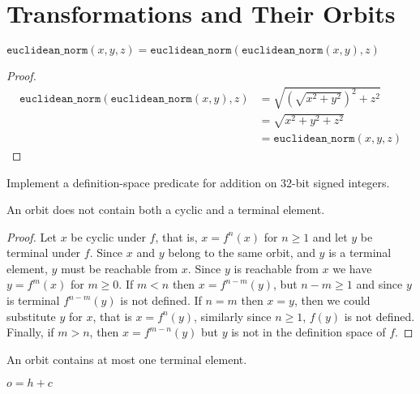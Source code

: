 
\chapter{Transformations and Their Orbits}

\begin{lemma}
	$\mathtt{euclidean\_norm}(x, y, z) = \mathtt{euclidean\_norm}(\mathtt{euclidean\_norm}(x, y), z)$
\end{lemma}

\begin{proof}
	\begin{align*}
		\mathtt{euclidean\_norm}(\mathtt{euclidean\_norm}(x, y), z)
		&= \sqrt{\left (\sqrt{x^2 + y^2} \right )^2 + z^2}\\
		&= \sqrt{x^2 + y^2 + z^2}\\
		&= \mathtt{euclidean\_norm}(x, y, z)
	\end{align*}
\end{proof}

\begin{exercise}
	Implement a definition-space predicate for addition on 32-bit signed integers.
\end{exercise}



\begin{lemma}
	An orbit does not contain both a cyclic and a terminal element.
\end{lemma}

\begin{proof}
	Let $x$ be cyclic under $f$, that is, $x = f^n(x)$ for $n \geq 1$ and let $y$ be
	terminal under $f$. Since $x$ and $y$ belong to the same orbit, and $y$ is a
	terminal element, $y$ must be reachable from $x$. Since $y$ is reachable from $x$
	we have $y = f^m(x)$ for $m \geq 0$. If $m < n$ then $x = f^{n - m}(y)$, but
	$n - m \geq 1$ and since $y$ is terminal $f^{n - m}(y)$ is not defined. If $n = m$
	then $x = y$, then we could substitute $y$ for $x$, that is $x = f^n(y)$, similarly
	since $n \geq 1$, $f(y)$ is not defined. Finally, if $m > n$, then $x = f^{m - n}(y)$
	but $y$ is not in the definition space of $f$.
\end{proof}

\begin{lemma}
	An orbit contains at most one terminal element.
\end{lemma}

\begin{lemma}
	$o = h + c$
\end{lemma}

